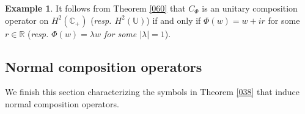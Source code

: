 \documentclass[11pt]{amsart}%
\theoremstyle{definition}
\newtheorem{exm}[thm]{Example}
\theoremstyle{remark}
\numberwithin{equation}{section}
\begin{document}
\begin{exm}
	It follows from Theorem \ref{060} that $C_{\Phi}$ is an unitary composition operator on
	$H^{2}(\mathbb{C}_{+})$ ({\it resp. $H^{2}(\mathbb{U})$}) if and only if $\Phi(w)=w+ir$ for some $r\in \mathbb{R}$ ({\it resp. $\Phi(w)=\lambda w$ for some
		$|\lambda|=1$}).
\end{exm}

\subsection{Normal composition operators}

We finish this section characterizing the symbols in Theorem \ref{038} that induce normal composition operators.
\end{document}
